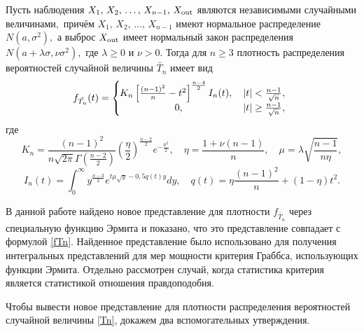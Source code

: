 \begin{theorem}[1]
Пусть  наблюдения $X_1,\,X_2,\,\ldots,\,X_{n-1},\,X_{\rm out}$
являются независимыми случайными величинами$,$ причём $X_1,\,X_2,\,\ldots,\,X_{n-1}$
имеют нормальное распределение $N(a,\sigma^2),$ а выброс
$X_{\rm out}$  имеет нормальный закон распределения $N(a+\lambda\sigma,\nu\sigma^2),$
где  $\lambda\ge 0$ и $\nu>0.$ Тогда для $n\ge 3$ плотность распределения
вероятностей случайной величины
$\tilde{T_{n}}$  имеет вид
\begin{equation}\label{fTn}
f_{\tilde{T_n}}(t)=
\left\{
\begin{array}{cr}
\hspace{-2mm}K_{n}\left[\frac{(n-1)^2}{n}-t^2\right]^{\frac{n-4}{2}}I_{n}(t),&\,|t|<\frac{n-1}{\sqrt{n}}, \\
0,&\,|t|\ge\frac{n-1}{\sqrt{n}},
\end{array}
\right.
\end{equation}
где
$$K_{n}=\frac{(n-1)^2}{n\sqrt{2\pi}\Gamma\left(\frac{n-2}{2}\right)}\left(\frac{\eta}{2}\right)^{\frac{n-2}{2}}e^{-\frac{\mu^2}{2}}, \quad  
\eta=\frac{1+\nu(n-1)}{n}, \quad \mu=\lambda\sqrt{\frac{n-1}{n\eta}},$$ 
$$ I_n(t)=\int^{\infty}_{0}y^{\frac{n-3}{2}}e^{t\mu\sqrt{y}-0,5q(t)y}dy,\quad q(t)= \eta\frac{(n-1)^2}{n}+(1-\eta)t^2.$$



\end{theorem}

В данной работе найдено новое представление для плотности $f_{\tilde{T_{n}}}$
через специальную функцию Эрмита и показано, что это представление совпадает
с формулой \eqref{fTn}. 
Найденное представление было использовано для получения интегральных представлений для  мер мощности  критерия Граббса, использующих функции Эрмита.
 Отдельно рассмотрен случай, когда статистика критерия является статистикой отношения правдоподобия.

\smallskip

Чтобы вывести новое представление для плотности распределения вероятностей случайной величины
\eqref{Tn}, докажем два вспомогательных утверждения.

